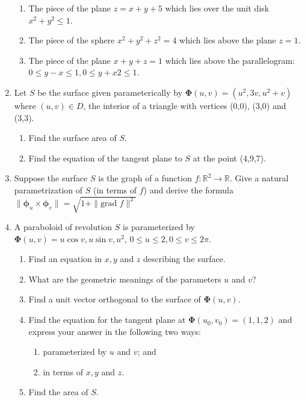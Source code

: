 \documentclass{article}
\newcommand{\norm}[1]{\| #1 \|}
\begin{document}
\begin{enumerate}
\begin{enumerate}
        \item The piece of the plane $z = x + y + 5$ which lies over the unit disk $x^2 + y^2 \leq 1$.
        \item The piece of the sphere $x^2 + y^2 + z^2 = 4$ which lies above the plane $z = 1$.
        \item The piece of the plane $x + y + z = 1$ which lies above the parallelogram: $0 \leq y - x \leq 1, 0 \leq y + x2 \leq 1$.
    \end{enumerate}
    \newpage
    \item Let $S$ be the surface given parameterically by $\boldsymbol \Phi (u,v) = (u^2, 3v, u^2 + v)$ where $(u,v) \in D$, the interior of a triangle with vertices (0,0), (3,0) and (3,3).
    \begin{enumerate}
        \item Find the surface area of $S$.
        \item Find the equation of the tangent plane to $S$ at the point (4,9,7).
    \end{enumerate}
    \newpage    
    \item Suppose the surface $S$ is the graph of a function $f : \mathbb{R}^2 \rightarrow \mathbb{R}$. Give a natural parametrization of $S$ (in terms of $f$) and derive the formula $\norm{\boldsymbol \phi_u \times \boldsymbol \phi_v} = \sqrt{1 + \norm{\text{grad }f}^2}$
    \newpage
    \item A paraboloid of revolution $S$ is parameterized by $\boldsymbol \Phi (u,v) = u \cos v, u \sin v, u^2$, $0 \leq u \leq 2, 0 \leq v \leq 2\pi$.
    \begin{enumerate}
        \item Find an equation in $x,y$ and $z$ describing the surface.
        \item What are the geometric meanings of the parameters $u$ and $v$?
        \item Find a unit vector orthogonal to the surface of $\boldsymbol \Phi (u,v)$.
        \item Find the equation for the tangent plane at $\boldsymbol \Phi(u_0,v_0) = (1,1,2)$ and express your answer in the following two ways:
        \begin{enumerate}
            \item parameterized by $u$ and $v$; and
            \item in terms of $x,y$ and $z$.
        \end{enumerate}

        \item Find the area of $S$.


\end{enumerate}
\end{enumerate}
\end{document}

